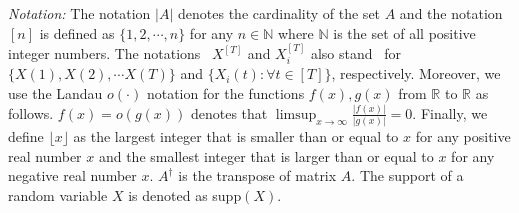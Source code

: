\documentclass[11pt]{article}
\begin{document}



{\it Notation:} The notation $|A|$ denotes the cardinality of the set $A$ and the notation $[n]$ is defined as $\{1,2,\cdots,n\}$ for any $n\in\mathbb{N}$ where $\mathbb{N}$ is the set of all positive integer numbers. The notations~ $X^{[T]}$ and $X_{i}^{[T]}$ also stand~ for $\{X(1), X(2), \cdots X(T)\}$ and $\{X_i(t): \forall t\in[T]\}$, respectively. Moreover, we use the Landau $o(\cdot)$ notation for the functions $f(x), g(x)$ from $\mathbb{R}$ to $\mathbb{R}$ as follows. $f(x)=o(g(x))$ denotes that $\limsup_{x\rightarrow\infty}\frac{|f(x)|}{|g(x)|}=0$. Finally, we define $\lfloor x\rfloor$  as the largest integer that is smaller than or equal to $x$  for any positive real number $x$ and  the smallest integer that is larger than or equal to $x$  for any negative real number $x$. $A^\dagger$ is the transpose of matrix $A$. The support of a random variable $X$ is denoted as supp$(X)$.
\end{document}
